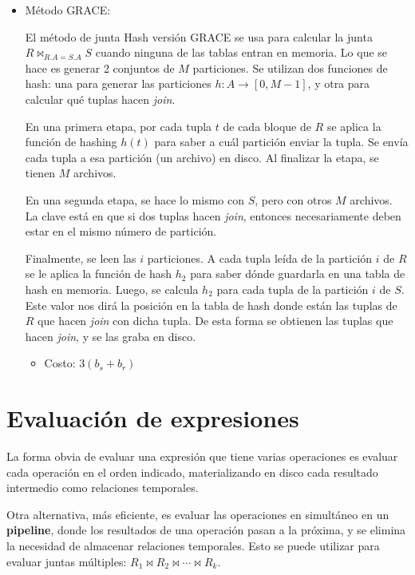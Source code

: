 \documentclass[a4paper, twoside]{article}
\newcommand{\codedir}{../resources/code} %
\begin{document}
\begin{itemize}
	

	\item Método GRACE:

	El método de junta Hash versión GRACE se usa para calcular la junta $R \bowtie_{R.A=S.A}S$ cuando ninguna de las tablas entran en memoria. Lo que se hace es generar 2 conjuntos de $M$ particiones. Se utilizan dos funciones de hash: una para generar las particiones $h:A\to[0,M-1]$, y otra para calcular qué tuplas hacen \emph{join}.

	En una primera etapa, por cada tupla $t$ de cada bloque de $R$ se aplica la función de hashing $h(t)$ para saber a cuál partición enviar la tupla. Se envía cada tupla a esa partición (un archivo) en disco. Al finalizar la etapa, se tienen $M$ archivos.

	En una segunda etapa, se hace lo mismo con $S$, pero con otros $M$ archivos. La clave está en que si dos tuplas hacen \emph{join}, entonces necesariamente deben estar en el mismo número de partición. 

	Finalmente, se leen las $i$ particiones. A cada tupla leída de la partición $i$ de $R$ se le aplica la función de hash $h_{2}$ para saber dónde guardarla en una tabla de hash en memoria. Luego, se calcula $h_{2}$ para cada tupla de la partición $i$ de $S$. Este valor nos dirá la posición en la tabla de hash donde están las tuplas de $R$ que hacen \emph{join} con dicha tupla. De esta forma se obtienen las tuplas que hacen \emph{join}, y se las graba en disco.
	\begin{itemize}
		\item Costo: $3\left(b_{s}+b_{r}\right)$
	\end{itemize}

	
\end{itemize}

\section{Evaluación de expresiones}
La forma obvia de evaluar una expresión que tiene varias operaciones es evaluar cada operación en el orden indicado, materializando en disco cada resultado intermedio como relaciones temporales.

Otra alternativa, más eficiente, es evaluar las operaciones en simultáneo en un \textbf{pipeline}, donde los resultados de una operación pasan a la próxima, y se elimina la necesidad de almacenar relaciones temporales. Esto se puede utilizar para evaluar juntas múltiples: $R_{1}\bowtie R_{2}\bowtie\cdots\bowtie R_{k}$.
\end{document}
